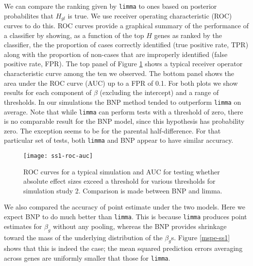 We can compare the ranking given by \texttt{limma} to ones based on posterior probabilites that $H_{gl}$ is true. We use receiver operating characteristic (ROC) curves to do this. ROC curves provide a graphical summary of the performance of a classifier by showing, as a function of the top $H$ genes as ranked by the classifier, the the proportion of cases correctly identified (true positive rate, TPR) along with the proportion of non-cases that are improperly identified (false positive rate, FPR). The top panel of Figure \ref{roc-ss1} shows a typical receiver operator characteristic curve among the ten we observed. The bottom panel shows the area under the ROC curve (AUC) up to a FPR of 0.1. For both plots we show results for each component of $\beta$ (excluding the intercept) and a range of thresholds. In our simulations the BNP method tended to outperform \texttt{limma} on average. Note that while \texttt{limma} can perform tests with a threshold of zero, there is no comparable result for the BNP model, since this hypothesis has probability zero. The exception seems to be for the parental half-difference. For that particular set of tests, both \texttt{limma} and BNP appear to have similar accuracy.
% 
\begin{figure}[ht!]
\centering
\texttt{[image: ss1-roc-auc]}
\begin{minipage}{.8\textwidth}
\caption{\small ROC curves for a typical simulation and AUC for testing whether absolute effect sizes exceed a threshold for various thresholds for simulation study 2. Comparison is made between BNP and limma.}
\label{roc-ss1}
\end{minipage}
\end{figure}

We also compared the accuracy of point estimate under the two models. Here we expect BNP to do much better than \texttt{limma}. This is because \texttt{limma} produces point estimates for $\beta_g$ without any pooling, whereas the BNP provides shrinkage toward the mass of the underlying distribution of the $\beta_g$s. Figure \ref{mspe-ss1} shows that this is indeed the case; the mean squared prediction errors averaging across genes are uniformly smaller that those for \texttt{limma}.

